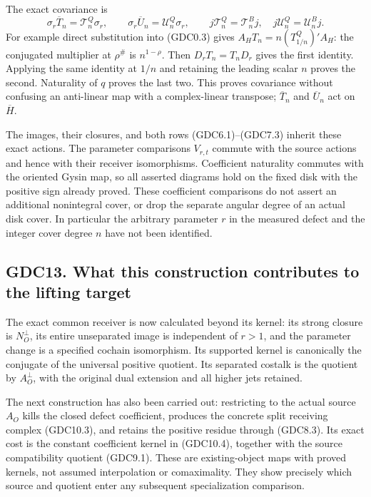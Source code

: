 The exact covariance is \[
\sigma_r\overline T_n=\mathcal T_n^Q\sigma_r,
\qquad \sigma_r\overline U_n=\mathcal U_n^Q\sigma_r,
\qquad j\mathcal T_n^Q=\mathcal T_n^B j,
\quad j\mathcal U_n^Q=\mathcal U_n^B j.
\tag{GDC12.2}
\] For example direct substitution into (GDC0.3) gives
\(A_HT_n=n(T_{1/n}^Q)'A_H\): the conjugated multiplier at \(\rho^\#\) is
\(n^{1-\rho}\). Then \(D_rT_n=T_nD_r\) gives the first identity.
Applying the same identity at \(1/n\) and retaining the leading scalar
\(n\) proves the second. Naturality of \(q\) proves the last two. This
proves covariance without confusing an anti-linear map with a
complex-linear transpose; \(\overline T_n\) and \(\overline U_n\) act on
\(\overline H\).

The images, their closures, and both rows (GDC6.1)--(GDC7.3) inherit
these exact actions. The parameter comparisons \(V_{r,t}\) commute with
the source actions and hence with their receiver isomorphisms.
Coefficient naturality commutes with the oriented Gysin map, so all
asserted diagrams hold on the fixed disk with the positive sign already
proved. These coefficient comparisons do not assert an additional
nonintegral cover, or drop the separate angular degree of an actual disk
cover. In particular the arbitrary parameter \(r\) in the measured
defect and the integer cover degree \(n\) have not been identified.

\subsection{GDC13. What this construction contributes to the lifting
target}\label{gdc13.-what-this-construction-contributes-to-the-lifting-target}

The exact common receiver is now calculated beyond its kernel: its
strong closure is \(N_O^\perp\), its entire unseparated image is
independent of \(r>1\), and the parameter change is a specified cochain
isomorphism. Its supported kernel is canonically the conjugate of the
universal positive quotient. Its separated costalk is the quotient by
\(A_O^\perp\), with the original dual extension and all higher jets
retained.

The next construction has also been carried out: restricting to the
actual source \(A_O\) kills the closed defect coefficient, produces the
concrete split receiving complex (GDC10.3), and retains the positive
residue through (GDC8.3). Its exact cost is the constant coefficient
kernel in (GDC10.4), together with the source compatibility quotient
(GDC9.1). These are existing-object maps with proved kernels, not
assumed interpolation or comaximality. They show precisely which source
and quotient enter any subsequent specialization comparison.

